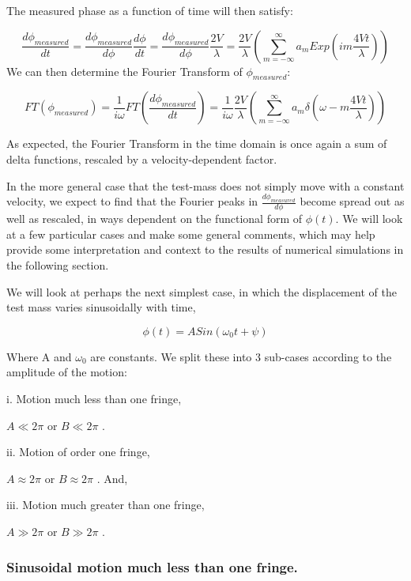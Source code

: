 \documentclass{article}
\begin{document}
The measured phase as a function of time will then satisfy:

\[
\frac{d\phi_{measured}}{dt}=\frac{d\phi_{measured}}{d\phi}\frac{d\phi}{dt}=\frac{d\phi_{measured}}{d\phi}\frac{2V}{\lambda}=\frac{2V}{\lambda}\left(\sum_{m=-\infty}^{\infty}a_{m}Exp\left(im\frac{4Vt}{\lambda}\right)\right)
\]
We can then determine the Fourier Transform of $\phi_{measured}$:

\[
FT\left(\phi_{measured}\right)=\frac{1}{i\omega}FT\left(\frac{d\phi_{measured}}{dt}\right)=\frac{1}{i\omega}\frac{2V}{\lambda}\left(\sum_{m=-\infty}^{\infty}a_{m}\delta(\omega-m\frac{4Vt}{\lambda})\right)
\]


As expected, the Fourier Transform in the time domain is once again
a sum of delta functions, rescaled by a velocity-dependent factor.

In the more general case that the test-mass does not simply move with
a constant velocity, we expect to find that the Fourier peaks in $\frac{d\phi_{measured}}{d\phi}$
become spread out as well as rescaled, in ways dependent on the functional
form of $\phi(t)$. We will look at a few particular cases and make
some general comments, which may help provide some interpretation
and context to the results of numerical simulations in the following
section.

We will look at perhaps the next simplest case, in which the displacement
of the test mass varies sinusoidally with time,

\begin{equation}
\phi\left(t\right)=ASin\left(\omega_{0}t+\psi\right)
\end{equation}


Where A and $\omega_{0}$ are constants. We split these into 3 sub-cases
according to the amplitude of the motion:

i. Motion much less than one fringe,

$A\ll2\pi$ or $B\ll2\pi$ .

ii. Motion of order one fringe,

$A\approx2\pi$ or $B\approx2\pi$ . And,

iii. Motion much greater than one fringe,

$A\gg2\pi$ or $B\gg2\pi$ .


\subsubsection{Sinusoidal motion much less than one fringe.}
\end{document}
